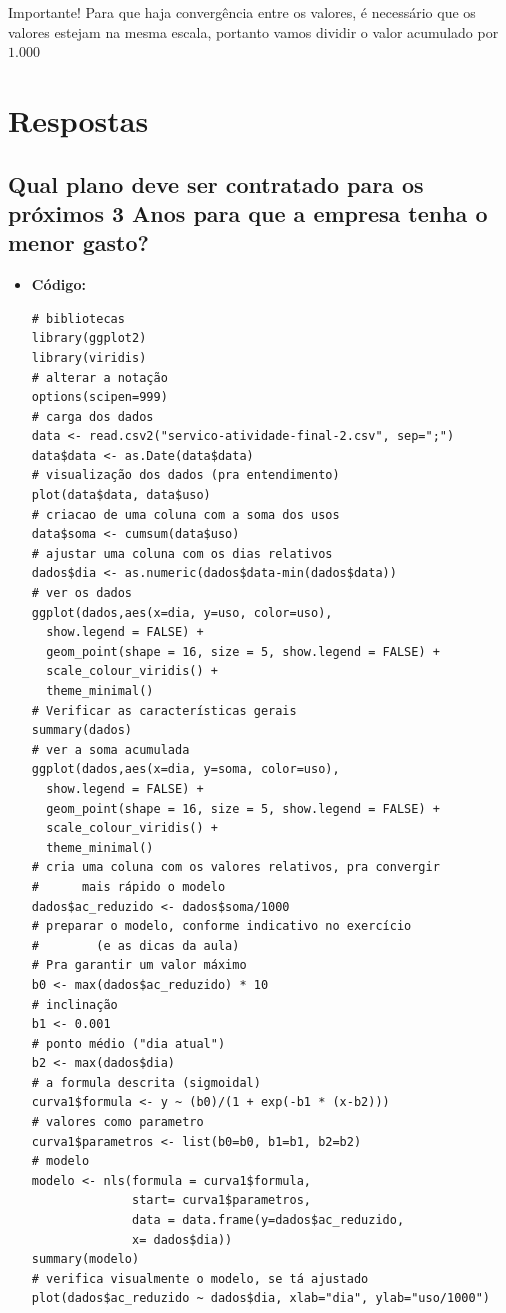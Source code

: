 \documentclass[a4paper,12pt]{article}
\begin{document}
Importante! Para que haja convergência entre os valores, é necessário que os valores estejam na mesma escala, portanto
vamos dividir o valor acumulado por $1.000$\\

\section{Respostas}

\subsection{Qual plano deve ser contratado para os próximos 3 Anos para que a empresa tenha o menor gasto?}

\begin{itemize}
    \item \textbf{Código:}
\begin{lstlisting}[language=Rlang]
# bibliotecas
library(ggplot2)
library(viridis)
# alterar a notação
options(scipen=999)
# carga dos dados
data <- read.csv2("servico-atividade-final-2.csv", sep=";")
data$data <- as.Date(data$data)
# visualização dos dados (pra entendimento)
plot(data$data, data$uso)
# criacao de uma coluna com a soma dos usos
data$soma <- cumsum(data$uso)
# ajustar uma coluna com os dias relativos
dados$dia <- as.numeric(dados$data-min(dados$data))
# ver os dados
ggplot(dados,aes(x=dia, y=uso, color=uso), 
  show.legend = FALSE) +
  geom_point(shape = 16, size = 5, show.legend = FALSE) +
  scale_colour_viridis() + 
  theme_minimal()
# Verificar as características gerais
summary(dados)
# ver a soma acumulada
ggplot(dados,aes(x=dia, y=soma, color=uso), 
  show.legend = FALSE) +
  geom_point(shape = 16, size = 5, show.legend = FALSE) +
  scale_colour_viridis() + 
  theme_minimal()
# cria uma coluna com os valores relativos, pra convergir 
#      mais rápido o modelo
dados$ac_reduzido <- dados$soma/1000
# preparar o modelo, conforme indicativo no exercício 
#        (e as dicas da aula)
# Pra garantir um valor máximo
b0 <- max(dados$ac_reduzido) * 10
# inclinação 
b1 <- 0.001
# ponto médio ("dia atual")
b2 <- max(dados$dia)
# a formula descrita (sigmoidal)
curva1$formula <- y ~ (b0)/(1 + exp(-b1 * (x-b2)))
# valores como parametro
curva1$parametros <- list(b0=b0, b1=b1, b2=b2)
# modelo
modelo <- nls(formula = curva1$formula, 
              start= curva1$parametros, 
              data = data.frame(y=dados$ac_reduzido, 
              x= dados$dia))
summary(modelo)
# verifica visualmente o modelo, se tá ajustado
plot(dados$ac_reduzido ~ dados$dia, xlab="dia", ylab="uso/1000")

\end{lstlisting}
\end{itemize}
\end{document}
